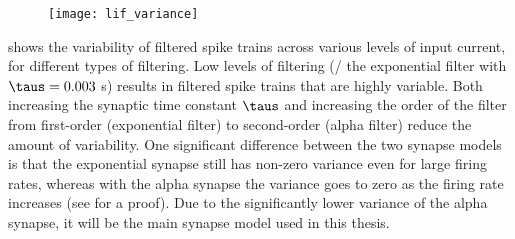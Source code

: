 \begin{figure}
  \centering
  \texttt{[image: lif\_variance]}
\end{figure}

 shows the variability of filtered spike trains
across various levels of input current,
for different types of filtering.
Low levels of filtering (\eg/ the exponential filter with $\taus = 0.003$ s)
results in filtered spike trains that are highly variable.
Both increasing the synaptic time constant $\taus$
and increasing the order of the filter from first-order (exponential filter)
to second-order (alpha filter) reduce the amount of variability.
One significant difference between the two synapse models
is that the exponential synapse still has non-zero variance
even for large firing rates,
whereas with the alpha synapse the variance goes to zero
as the firing rate increases
(see  for a proof).
Due to the significantly lower variance of the alpha synapse,
it will be the main synapse model used in this thesis.

